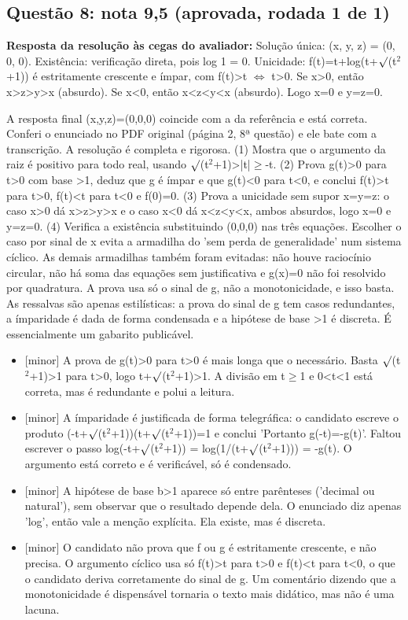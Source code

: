 \documentclass{article}%
\begin{document}
\subsection*{Questão 8: nota 9,5 (aprovada, rodada 1 de 1)}%
\textbf{Resposta da resolução às cegas do avaliador:} Solução única: (x, y, z) = (0, 0, 0). Existência: verificação direta, pois log 1 = 0. Unicidade: f(t)=t+log(t+$\surd$(t$^2$+1)) é estritamente crescente e ímpar, com f(t)>t $\Leftrightarrow$ t>0. Se x>0, então x>z>y>x (absurdo). Se x<0, então x<z<y<x (absurdo). Logo x=0 e y=z=0.\par %
A resposta final (x,y,z)=(0,0,0) coincide com a da referência e está correta. Conferi o enunciado no PDF original (página 2, 8ª questão) e ele bate com a transcrição. A resolução é completa e rigorosa. (1) Mostra que o argumento da raiz é positivo para todo real, usando $\surd$(t$^2$+1)>|t|$\geq$-t. (2) Prova g(t)>0 para t>0 com base >1, deduz que g é ímpar e que g(t)<0 para t<0, e conclui f(t)>t para t>0, f(t)<t para t<0 e f(0)=0. (3) Prova a unicidade sem supor x=y=z: o caso x>0 dá x>z>y>x e o caso x<0 dá x<z<y<x, ambos absurdos, logo x=0 e y=z=0. (4) Verifica a existência substituindo (0,0,0) nas três equações. Escolher o caso por sinal de x evita a armadilha do 'sem perda de generalidade' num sistema cíclico. As demais armadilhas também foram evitadas: não houve raciocínio circular, não há soma das equações sem justificativa e g(x)=0 não foi resolvido por quadratura. A prova usa só o sinal de g, não a monotonicidade, e isso basta. As ressalvas são apenas estilísticas: a prova do sinal de g tem casos redundantes, a ímparidade é dada de forma condensada e a hipótese de base >1 é discreta. É essencialmente um gabarito publicável.%
\begin{itemize}%
\item%
{[}minor{]} A prova de g(t)>0 para t>0 é mais longa que o necessário. Basta $\surd$(t$^2$+1)>1 para t>0, logo t+$\surd$(t$^2$+1)>1. A divisão em t$\geq$1 e 0<t<1 está correta, mas é redundante e polui a leitura.%
\item%
{[}minor{]} A ímparidade é justificada de forma telegráfica: o candidato escreve o produto (-t+$\surd$(t$^2$+1))(t+$\surd$(t$^2$+1))=1 e conclui 'Portanto g(-t)=-g(t)'. Faltou escrever o passo log(-t+$\surd$(t$^2$+1)) = log(1/(t+$\surd$(t$^2$+1))) = -g(t). O argumento está correto e é verificável, só é condensado.%
\item%
{[}minor{]} A hipótese de base b>1 aparece só entre parênteses ('decimal ou natural'), sem observar que o resultado depende dela. O enunciado diz apenas 'log', então vale a menção explícita. Ela existe, mas é discreta.%
\item%
{[}minor{]} O candidato não prova que f ou g é estritamente crescente, e não precisa. O argumento cíclico usa só f(t)>t para t>0 e f(t)<t para t<0, o que o candidato deriva corretamente do sinal de g. Um comentário dizendo que a monotonicidade é dispensável tornaria o texto mais didático, mas não é uma lacuna.%
\end{itemize}%
\end{document}
